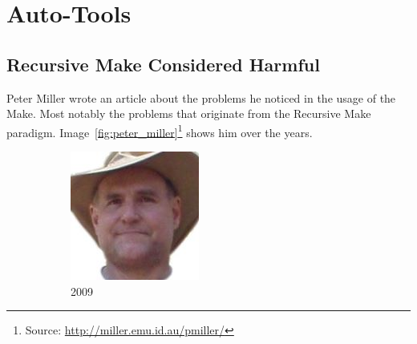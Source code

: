 
\section{Auto-Tools}


\subsection{Recursive Make Considered Harmful}
Peter Miller wrote an article about the problems he noticed in the usage of the Make. Most notably the problems that originate from the Recursive Make paradigm.
Image~\ref{fig:peter_miller}\footnote{Source: \url{http://miller.emu.id.au/pmiller/}} shows him over the years.
\begin{figure} \centering
\captionsetup[subfigure]{labelformat=empty}
\begin{subfigure}{0.19\textwidth}
\includegraphics[width=\textwidth]{images/peter_miller_2009.jpg}
\caption{2009}
\end{subfigure}
\begin{subfigure}{0.19\textwidth}

\end{subfigure}
\end{figure}
